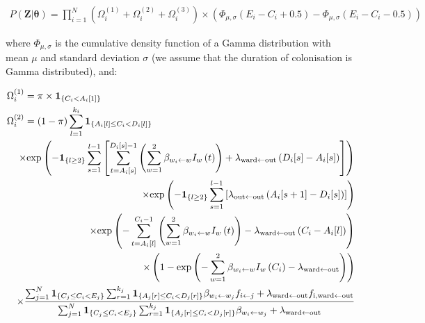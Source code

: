 \documentclass[10pt]{article}
\begin{document}
\begin{eqnarray*}
P\left(\bm{Z}|\bm{\theta}\right) = 
\bm{\prod}_{i=1}^N %
\left( \Omega_i^{\left(1\right)} + \Omega_i^{\left(2\right)} + \Omega_i^{\left(3\right)} \right) \times \left(\Phi_{\mu,\sigma}\left(E_i-C_i+0.5\right) - \Phi_{\mu,\sigma}\left(E_i-C_i-0.5\right) \right)
\end{eqnarray*}

\noindent where $\Phi_{\mu,\sigma}$ is the cumulative density function of a Gamma distribution with mean $\mu$ and standard deviation $\sigma$ (we assume that the duration of colonisation is Gamma distributed), and: 

\begin{eqnarray*}
\lefteqn{\Omega_i^{\left(1\right)} = \pi \times \mathbf{1}_{\left\lbrace C_i < A_i[1] \right\rbrace} }\\
\lefteqn{\Omega_i^{\left(2\right)}  = \left( 1-\pi \right) \sum_{l=1}^{k_i} \mathbf{1}_{\left\lbrace A_i[l] \leq C_i < D_i[l] \right\rbrace}}\\
	 && \times \text{exp}\left( - \mathbf{1}_{\left\lbrace l \geq 2 \right\rbrace} \sum_{s=1}^{l-1} \left[ \sum_{t=A_i[s]}^{D_i[s]-1} \left( \sum_{w=1}^{2} \beta_{w_i \leftarrow w} I_w\left(t\right) \right) + \lambda_{\text{ward} \leftarrow \text{out}}\left(D_i[s]-A_i[s]\right) \right] \right) \\
	 && \times \text{exp}\left( - \mathbf{1}_{\left\lbrace l \geq 2 \right\rbrace} \sum_{s=1}^{l-1} \left[ \lambda_{\text{out} \leftarrow \text{out}}\left(A_i[s+1]-D_i[s]\right) \right] \right) \\
	 && \times \text{exp}\left( - \sum_{t=A_i[l]}^{C_i-1} \left( \sum_{w=1}^{2} \beta_{w_i \leftarrow w} I_w\left(t\right) \right) - \lambda_{\text{ward} \leftarrow \text{out}}\left(C_i-A_i[l]\right)  \right) \\
	 && \times \left( 1 - \text{exp}\left( - \sum_{w=1}^{2} \beta_{w_i \leftarrow w} I_w\left(C_i\right) - \lambda_{\text{ward} \leftarrow \text{out}} \right) \right) \\
	 && \times \frac{\sum_{j=1}^N \mathbf{1}_{\left\lbrace C_j \leq C_i < E_j \right\rbrace} \sum_{r=1}^{k_j} \mathbf{1}_{\left\lbrace A_j[r] \leq C_i < D_j[r] \right\rbrace} \beta_{w_i \leftarrow w_j} f_{i \leftarrow j} + \lambda_{\text{ward} \leftarrow \text{out}}f_{\text{i},\text{ward} \leftarrow \text{out}} }{\sum_{j=1}^N \mathbf{1}_{\left\lbrace C_j \leq C_i < E_j \right\rbrace} \sum_{r=1}^{k_j} \mathbf{1}_{\left\lbrace A_j[r] \leq C_i < D_j[r] \right\rbrace} \beta_{w_i \leftarrow w_j} + \lambda_{\text{ward} \leftarrow \text{out}} } \\

\end{eqnarray*}
\end{document}
